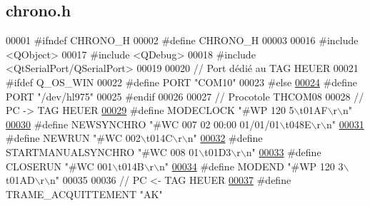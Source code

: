 \hypertarget{chrono_8h_source}{}\subsection{chrono.\+h}
\label{chrono_8h_source}

\begin{DoxyCode}
00001 \textcolor{preprocessor}{#ifndef CHRONO\_H}
00002 \textcolor{preprocessor}{#define CHRONO\_H}
00003 
00016 \textcolor{preprocessor}{#include <QObject>}
00017 \textcolor{preprocessor}{#include <QDebug>}
00018 \textcolor{preprocessor}{#include <QtSerialPort/QSerialPort>}
00019 
00020 \textcolor{comment}{// Port dédié au TAG HEUER}
00021 \textcolor{preprocessor}{#ifdef Q\_OS\_WIN}
00022 \textcolor{preprocessor}{#define PORT                    "COM10"}
00023 \textcolor{preprocessor}{#else}
\hyperlink{chrono_8h_a614217d263be1fb1a5f76e2ff7be19a2}{00024} \textcolor{preprocessor}{#define PORT                    "/dev/hl975"}
00025 \textcolor{preprocessor}{#endif}
00026 
00027 \textcolor{comment}{// Procotole THCOM08}
00028 \textcolor{comment}{// PC -> TAG HEUER}
\hyperlink{chrono_8h_a51714542fe5fc5c442f126a96c568050}{00029} \textcolor{preprocessor}{#define MODECLOCK               "#WP 120 5\(\backslash\)t01AF\(\backslash\)r\(\backslash\)n"}
\hyperlink{chrono_8h_a6fd2c46c463ee5bf46edf6f117c277ec}{00030} \textcolor{preprocessor}{#define NEWSYNCHRO              "#WC 007 02 00:00 01/01/01\(\backslash\)t048E\(\backslash\)r\(\backslash\)n"}
\hyperlink{chrono_8h_a4dcfb7100df159ff3082add0247cd3ee}{00031} \textcolor{preprocessor}{#define NEWRUN                  "#WC 002\(\backslash\)t014C\(\backslash\)r\(\backslash\)n"}
\hyperlink{chrono_8h_a0130f9324a15a83d5609c874891d9d1f}{00032} \textcolor{preprocessor}{#define STARTMANUALSYNCHRO      "#WC 008 01\(\backslash\)t01D3\(\backslash\)r\(\backslash\)n"}
\hyperlink{chrono_8h_aadc6271993e3725db8c6640289f8d2bb}{00033} \textcolor{preprocessor}{#define CLOSERUN                "#WC 001\(\backslash\)t014B\(\backslash\)r\(\backslash\)n"}
\hyperlink{chrono_8h_a95708e00882b95a7b2d68b2f75c3913c}{00034} \textcolor{preprocessor}{#define MODEND                  "#WP 120 3\(\backslash\)t01AD\(\backslash\)r\(\backslash\)n"}
00035 
00036 \textcolor{comment}{// PC <- TAG HEUER}
\hyperlink{chrono_8h_a2c9f7b58ba826bd8365c9a611389fe42}{00037} \textcolor{preprocessor}{#define TRAME\_ACQUITTEMENT      "AK"}

\end{DoxyCode}
